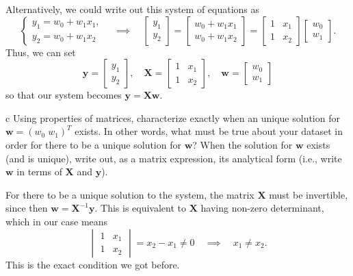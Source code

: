 \documentclass[expanded]{pset}
\begin{document}
\begin{parts}
  Alternatively, we could write out this system of equations as
  \[
    \begin{cases}
      y_1 = w_0 + w_1 x_1,\\ y_2 = w_0 + w_1 x_2
    \end{cases}\quad \implies\quad \begin{bmatrix}y_1\\y_2\end{bmatrix} = \begin{bmatrix} w_0 + w_1x_1\\ w_0 + w_1 x_2\end{bmatrix} = \begin{bmatrix}1&x_1\\1&x_2\end{bmatrix}\begin{bmatrix}w_0\\w_1\end{bmatrix}.
  \]
  Thus, we can set
  \[
    \mathbf{y}=\begin{bmatrix}y_1\\y_2\end{bmatrix},\quad \mathbf{X}=\begin{bmatrix}1&x_1\\1&x_2\end{bmatrix}, \quad \mathbf{w}=\begin{bmatrix}w_0\\w_1\end{bmatrix}
  \]
  so that our system becomes $\mathbf{y}=\mathbf{X}\mathbf{w}$.

  \begin{part}{c}
    Using properties of matrices, characterize exactly when an unique solution for  $\mathbf{w}=\left(w_0 \; w_1 \right)^{T}$ exists. In other words, what must be true about your dataset in order for there to be a unique solution for $\mathbf{w}$? When the solution for $\mathbf{w}$ exists (and is unique), write out, as a matrix expression, its analytical form (i.e., write $\mathbf{w}$ in terms of $\mathbf{X}$ and $\mathbf{y}$).
  \end{part}

  For there to be a unique solution to the system, the matrix $\mathbf{X}$ must be invertible, since then $\mathbf{w} = \mathbf{X}^{-1}\mathbf{y}$. This is equivalent to $\mathbf{X}$ having non-zero determinant, which in our case means
  \[
    \begin{vmatrix}1&x_1\\1&x_2\end{vmatrix}=x_2 - x_1\neq 0 \quad\implies\quad x_1\neq x_2.
  \]
  This is the exact condition we got before.


\end{parts}
\end{document}
